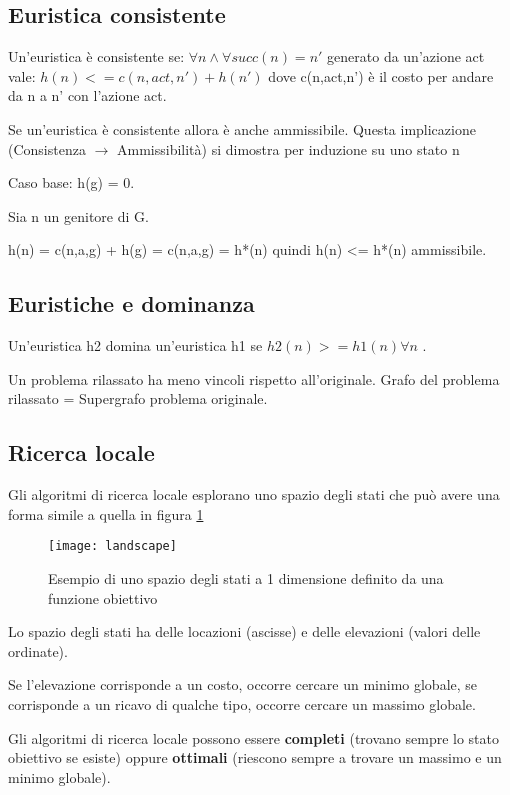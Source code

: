 \subsection{Euristica consistente}

Un'euristica è consistente se:
$\forall n \land \forall succ(n) = n'$ generato da un'azione act vale:
$h(n) <= c(n,act,n') + h(n')$
dove c(n,act,n') è il costo per andare da n a n' con l'azione act.

Se un'euristica è consistente allora è anche ammissibile.
Questa implicazione (Consistenza $\rightarrow$ Ammissibilità) si dimostra per
induzione su uno stato n

Caso base:
h(g) = 0.

Sia n un genitore di G.

h(n) = c(n,a,g) + h(g) = c(n,a,g) = h*(n) quindi h(n) <= h*(n) ammissibile.

\subsection{Euristiche e dominanza}

Un'euristica h2 domina un'euristica h1 se $h2(n) >= h1(n) \forall n$ .

Un problema rilassato ha meno vincoli rispetto all'originale.
Grafo del problema rilassato = Supergrafo problema originale.

\subsection{Ricerca locale}

Gli algoritmi di ricerca locale esplorano uno spazio degli stati che può avere
una forma simile a quella in figura \ref{fig:landscape}

\begin{figure}[H]
\centering
\texttt{[image: landscape]}
\caption{Esempio di uno spazio degli stati a 1 dimensione definito da una
funzione obiettivo}
\label{fig:landscape}
\end{figure}

Lo spazio degli stati ha delle locazioni (ascisse) e delle elevazioni
(valori delle ordinate).

Se l'elevazione corrisponde a un costo, occorre cercare un minimo globale,
se corrisponde a un ricavo di qualche tipo, occorre cercare un massimo globale.

Gli algoritmi di ricerca locale possono essere \textbf{completi} (trovano
sempre lo stato obiettivo se esiste) oppure \textbf{ottimali} (riescono sempre a
trovare un massimo e un minimo globale).

